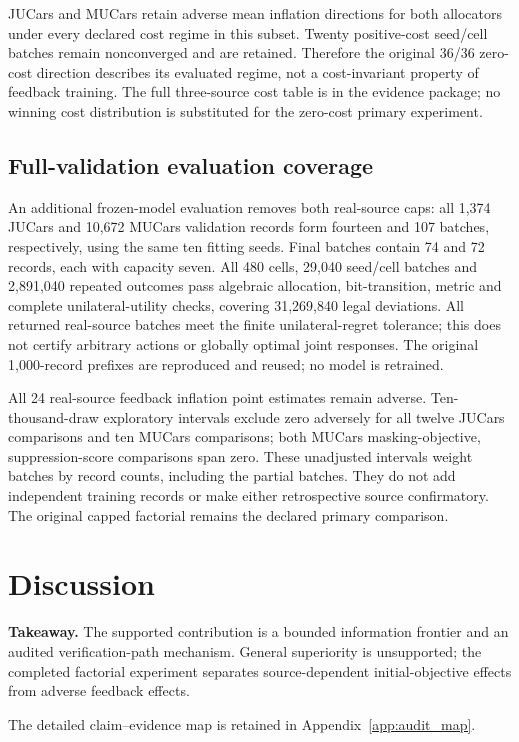 \documentclass[11pt]{article}
\begin{document}
JUCars and MUCars retain adverse mean inflation directions for both allocators
under every declared cost regime in this subset. Twenty positive-cost
seed/cell batches remain nonconverged and are retained. Therefore the original
36/36 zero-cost direction describes its evaluated regime, not a cost-invariant
property of feedback training. The full three-source cost table is in the
evidence package; no winning cost distribution is substituted for the zero-cost
primary experiment.

\subsection{Full-validation evaluation coverage}
An additional frozen-model evaluation removes both real-source caps: all
1,374 JUCars and 10,672 MUCars validation records form fourteen and 107 batches,
respectively, using the same ten fitting seeds. Final batches contain 74 and
72 records, each with capacity seven. All 480 cells, 29,040 seed/cell batches
and 2,891,040 repeated outcomes pass algebraic allocation, bit-transition,
metric and complete unilateral-utility checks, covering 31,269,840 legal
deviations. All returned real-source batches meet the finite unilateral-regret
tolerance; this does not certify arbitrary actions or globally optimal joint
responses. The original 1,000-record prefixes are reproduced and reused;
no model is retrained.

All 24 real-source feedback inflation point estimates remain adverse.
Ten-thousand-draw exploratory intervals exclude zero adversely for all twelve
JUCars comparisons and ten MUCars comparisons; both MUCars masking-objective,
suppression-score comparisons span zero. These unadjusted intervals weight
batches by record counts, including the partial batches. They do not add
independent training records or make either retrospective source confirmatory.
The original capped factorial remains the declared primary comparison.

\section{Discussion}\label{sec:discussion}
\noindent\textbf{Takeaway.} The supported contribution is a bounded information
frontier and an audited verification-path mechanism. General superiority is unsupported; the completed factorial experiment
separates source-dependent initial-objective effects from adverse feedback effects.

The detailed claim--evidence map is retained in Appendix~\ref{app:audit_map}.
\end{document}
